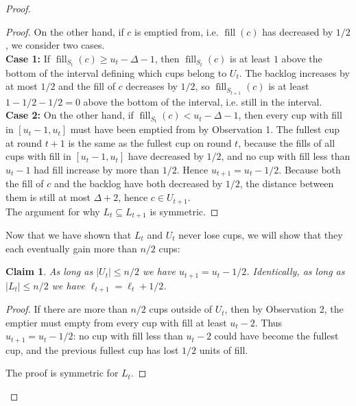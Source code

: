 \documentclass[twocolumn]{article}[10pt]
\DeclareMathOperator{\fil}{\text{fill}}
\newtheorem{clm}{Claim}
\begin{document}
\begin{proof}
\begin{proof}
    On the other hand, if $c$ is emptied from, i.e. $\fil(c)$ has decreased by
    $1/2$, we consider two cases.\\
    \textbf{Case 1:} If $\fil_{S_t}(c) \ge u_t-\Delta -1$, then $\fil_{S_t}(c)$
    is at least $1$ above the bottom of the interval defining which cups belong to $U_t$. The backlog increases by
    at most $1/2$ and the fill of $c$ decreases by $1/2$, so
    $\fil_{S_{t+1}}(c)$ is at least $1-1/2-1/2 = 0$ above the bottom of the
    interval, i.e. still in the interval. \\
    \textbf{Case 2:} On the other hand, if $\fil_{S_t}(c) < u_t-\Delta-1$, then every cup
        with fill in $[u_t-1, u_t]$ must have been emptied
        from by Observation 1. The fullest cup at round $t+1$ is the same as the fullest cup on
        round $t$, because the fills of all cups with fill in
        $[u_t-1, u_t]$ have decreased by $1/2$, and no cup with fill less than
        $u_t-1$ had fill increase by more than $1/2$. Hence $u_{t+1} = u_t -1/2$.
        Because both the fill of $c$ and the backlog have both decreased by $1/2$, the distance between them is still at most $\Delta+2$, hence $c\in U_{t+1}$.\\
    The argument for why $L_t \subseteq L_{t+1}$ is symmetric.
  \end{proof}

  Now that we have shown that $L_t$ and $U_t$ never lose cups, we will show
  that they each eventually gain more than $n/2$ cups:

  \begin{clm}
    \label{clm:smallthenbigger}
    As long as $|U_t| \le n/2$ we have $u_{t+1} = u_t -1/2$. Identically, as
    long as $|L_t| \le n/2$ we have $\ell_{t+1} = \ell_t+ 1/2$.
  \end{clm}
  \begin{proof}
    If there are more than $n/2$ cups outside of $U_t$, then by Observation 2, the emptier must empty from
    every cup with fill at least $u_t-2$. Thus $u_{t+1} = u_t -1/2$: no cup
    with fill less than $u_t-2$ could have become the fullest cup, and the
    previous fullest cup has lost $1/2$ units of fill. 

    The proof is symmetric for $L_t$.
  \end{proof}


\end{proof}
\end{document}
